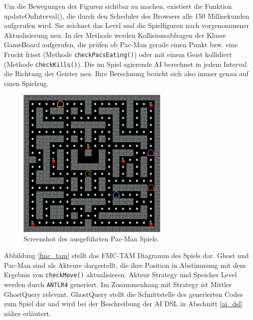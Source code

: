 \documentclass[conference]{IEEEtran}
\begin{document}
Um die Bewegungen der Figuren sichtbar zu machen, existiert die Funktion updateOnInterval(), die durch den Scheduler des Browsers alle 150 Millisekunden aufgerufen wird. Sie zeichnet das Level und die Spielfiguren nach vorgenommener Aktualisierung neu. In der Methode werden Kollisionsabfragen der Klasse GameBoard aufgerufen, die prüfen ob Pac-Man gerade einen Punkt bzw. eine Frucht frisst (Methode \texttt{checkPacsEating()}) oder mit einem Geist kollidiert (Methode \texttt{checkKills()}). Die im Spiel agierende AI berechnet in jedem Interval die Richtung der Geister neu. Ihre Berechnung bezieht sich also immer genau auf einen Spielzug.

\begin{figure}[!t]
\centering
\includegraphics[width=2.9in]{screenshot.png}

\caption{Screenshot des ausgeführten Pac-Man Spiels.}
\label{pac_screen}
\end{figure}

Abbildung \ref{fmc_tam} stellt das FMC-TAM Diagramm des Spiels dar. Ghost und Pac-Man sind als Akteure dargestellt, die ihre Position in Abstimmung mit dem Ergebnis von \texttt{checkMove()} aktualisieren. Akteur Strategy und Speicher Level werden durch \texttt{ANTLR4} generiert. Im Zusammenhang mit Strategy ist Mittler GhostQuery relevant. GhostQuery stellt die Schnittstelle des generierten Codes zum Spiel dar und wird bei der Beschreibung der AI DSL in Abschnitt \ref{ai_dsl} näher erläutert.
\end{document}
